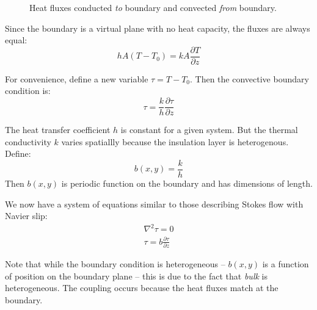 \documentclass[12pt, a4paper, twoside, openright]{book}
\begin{document}
\begin{figure}[ht]
\centering
{}
\caption{Heat fluxes conducted \emph{to} boundary and convected \emph{from} boundary.}\label{boundaryflux}
\end{figure}

Since the boundary is a virtual plane with no heat capacity, the fluxes are always equal:
\begin{equation}
h A (T - T_0) = k A \frac{\partial T}{\partial z}
\end{equation}

For convenience, define a new variable $ \tau = T - T_0$.  Then the convective boundary condition is:
\begin{equation}
\tau = \frac{k}{h} \frac{\partial \tau}{\partial z}
\end{equation}

The heat transfer coefficient $h$ is constant for a given system.  But the thermal conductivity $k$ varies spatiallly because the insulation layer is heterogenous.   Define:
\begin{equation}
b(x,y) = \frac{k}{h}
\end{equation}
Then $b(x,y)$ is periodic function on the boundary and has dimensions of length.

\clearpage
We now have a system of equations similar to those describing Stokes flow with Navier slip:
\begin{gather}
\nabla^2 \tau = 0 \\
\tau = b \frac{\partial \tau}{\partial z}
\end{gather}

Note that while the boundary condition is heterogeneous -- $b(x,y)$ is a function of position on the boundary plane -- this is due to the fact that \emph{bulk} is heterogeneous.  The coupling occurs because the heat fluxes match at the boundary.
\end{document}
